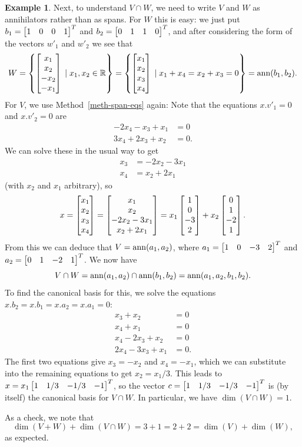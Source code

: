 \documentclass[reqno]{amsart}
\theoremstyle{definition}
\newtheorem{example}[theorem]{Example}
\begin{document}
\begin{example}
 Next, to understand $V\cap W$, we need to write $V$ and $W$ as
 annihilators rather than as spans.  For $W$ this is easy: we just put
 $b_1=\left[\begin{matrix} 1&0&0&1\end{matrix}\right]^T$ and $b_2=\left[\begin{matrix} 0&1&1&0\end{matrix}\right]^T$, and after
 considering the form of the vectors $w'_1$ and $w'_2$ we see that
 \[ W
    = \left\{\left[\begin{matrix} x_1 \\ x_2 \\ -x_2 \\ -x_1\end{matrix}\right] \;|\; x_1,x_2 \in{\mathbb{R}} \right\}
    = \left\{\left[\begin{matrix} x_1 \\ x_2 \\  x_3 \\  x_4\end{matrix}\right] \;|\; x_1+x_4=x_2+x_3=0 \right\}
    = \operatorname{ann}(b_1,b_2).
 \]
 For $V$, we use Method~\ref{meth-span-eqs} again:
 Note that the equations $x.v'_1=0$ and $x.v'_2=0$ are
 \begin{align*}
  -2x_4-x_3+x_1 &= 0 \\
  3x_4+2x_3+x_2 &= 0.
 \end{align*}
 We can solve these in the usual way to get
 \begin{align*}
  x_3 &= -2x_2-3x_1 \\
  x_4 &= x_2+2x_1
 \end{align*}
 (with $x_2$ and $x_1$ arbitrary), so
 \[ x
    = \left[\begin{matrix} x_1 \\ x_2 \\ x_3 \\ x_4 \end{matrix}\right]
    = \left[\begin{matrix} x_1 \\ x_2 \\ -2x_2-3x_1 \\ x_2+2x_1 \end{matrix}\right]
    = x_1 \left[\begin{matrix} 1 \\ 0 \\ -3 \\ 2 \end{matrix}\right] +
      x_2 \left[\begin{matrix} 0 \\ 1 \\ -2 \\ 1 \end{matrix}\right].
 \]
 From this we can deduce that $V=\operatorname{ann}(a_1,a_2)$, where
 $a_1=\left[\begin{matrix} 1&0&-3&2\end{matrix}\right]^T$ and $a_2=\left[\begin{matrix} 0&1&-2&1\end{matrix}\right]^T$.  We now have
 \[ V\cap W=\operatorname{ann}(a_1,a_2)\cap\operatorname{ann}(b_1,b_2)=\operatorname{ann}(a_1,a_2,b_1,b_2). \]
 To find the canonical basis for this, we solve the equations
 $x.b_2=x.b_1=x.a_2=x.a_1=0$:
 \begin{align*}
  x_3+x_2 &= 0 \\
  x_4+x_1 &= 0 \\
  x_4-2x_3+x_2 &= 0 \\
  2x_4-3x_3+x_1 &= 0.
 \end{align*}
 The first two equations give $x_3=-x_2$ and $x_4=-x_1$, which we can
 substitute into the remaining equations to get $x_2=x_1/3$.  This
 leads to $x=x_1\left[\begin{matrix} 1&1/3&-1/3&-1\end{matrix}\right]^T$, so the vector
 $c=\left[\begin{matrix} 1&1/3&-1/3&-1\end{matrix}\right]^T$ is (by itself) the canonical basis for
 $V\cap W$.  In particular, we have $\dim(V\cap W)=1$.

 As a check, we note that
 \[ \dim(V+W)+\dim(V\cap W) = 3+1 = 2+2 = \dim(V)+\dim(W), \]
 as expected.
\end{example}
\end{document}
